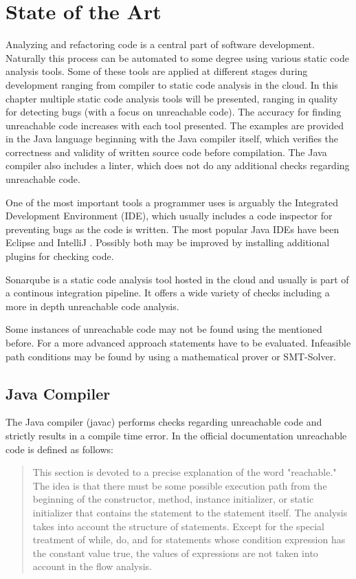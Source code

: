 
\chapter{State of the Art}
\label{cha:state of the art}

Analyzing and refactoring code is a central part of software development. Naturally this process can be automated to some degree using various static code analysis tools. 
Some of these tools are applied at different stages during development ranging from compiler to static code analysis in the cloud.
In this chapter multiple static code analysis tools will be presented, ranging in quality for detecting bugs (with a focus on unreachable code).
The accuracy for finding unreachable code increases with each tool presented. 
The examples are provided in the Java language beginning with the Java compiler itself, which verifies the correctness and validity of written source code before compilation. 
The Java compiler also includes a linter, which does not do any additional checks regarding unreachable code. 


One of the most important tools a programmer uses is arguably the Integrated Development Environment (IDE), which usually includes a code inspector for preventing bugs as the code is written. 
The most popular Java IDEs have been Eclipse \cite{incCommunityOpenInnovation} and IntelliJ \cite{IntelliJIDEACapable}. 
Possibly both may be improved by installing additional plugins for checking code.


Sonarqube \cite{sonarqube} is a static code analysis tool hosted in the cloud and usually is part of a continous integration pipeline. It offers a wide variety of checks including a more in depth unreachable code analysis.


Some instances of unreachable code may not be found using the mentioned before. For a more advanced approach statements have to be evaluated. Infeasible path conditions may be found by using a mathematical prover or SMT-Solver.

\section{Java Compiler}
\label{sec:Java compiler}

The Java compiler (javac) performs checks regarding unreachable code and strictly results in a compile time error. 
In the official documentation \cite{Chapter14Blocks} unreachable code is defined as follows:
\begin{quote}
\label{quote:Java unreachable definition}
This section is devoted to a precise explanation of the word "reachable." 
The idea is that there must be some possible execution path from the beginning of the constructor, method, instance initializer, or static initializer that contains the statement to the statement itself. The analysis takes into account the structure of statements. Except for the special treatment of while, do, and for statements whose condition expression has the constant value true, the values of expressions are not taken into account in the flow analysis.
\end{quote}

